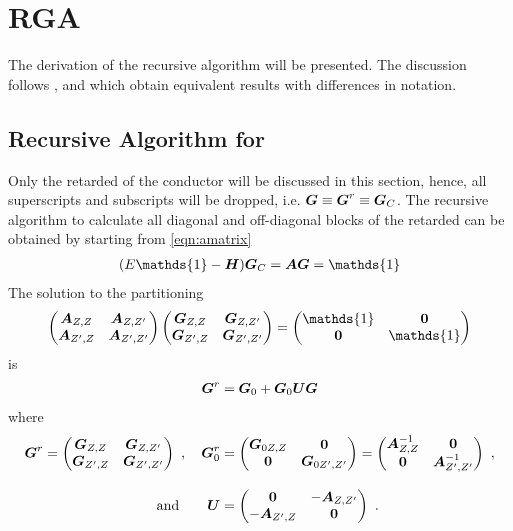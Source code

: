 \chapter{RGA}
\label{app:RGA}
The derivation of the recursive \gfnc{} algorithm will be presented. The discussion follows \cite{JApplPhys.91.2343}, \cite{JApplPhys.81.7845} and \cite{Wimmer2009Thesis} which obtain equivalent results with differences in notation.
\section{Recursive Algorithm for }
Only the retarded \gfnc{} of the conductor will be discussed in this section, hence, all superscripts and subscripts will be dropped, i.e. $\boldsymbol{G} \equiv \boldsymbol{G}^r\equiv \boldsymbol{G}_C$. The recursive algorithm to calculate all diagonal and off-diagonal blocks of the retarded \gfnc{} can be obtained by starting from \cref{eqn:amatrix}
\begin{align}
(E\mathds{1}-\mat{H})\mat{G}_C = \mat{A}\mat{G}=\mathds{1}
\label{eqn:amatrixppendix}
\end{align}
The solution to the partitioning
\begin{align}
\begin{pmatrix} \mat{A}_{Z,Z} & \mat{A}_{Z,Z'}\\
		\mat{A}_{Z',Z} & \mat{A}_{Z',Z'}
\end{pmatrix}
\begin{pmatrix} \mat{G}_{Z,Z} & \mat{G}_{Z,Z'}\\
		\mat{G}_{Z',Z} & \mat{G}_{Z',Z'}
\end{pmatrix} = 
\begin{pmatrix} \mathds{1} & \mat{0}\\
		\mat{0} & \mathds{1}
\end{pmatrix}
\end{align}
is
\begin{align}
\boldsymbol{G}^r=\boldsymbol{G}_0+\boldsymbol{G}_0\boldsymbol{U}\boldsymbol{G}
\label{eqn:dysonequationappendix}
\end{align}
where 
\begin{align}
\boldsymbol{G}^r = 
\begin{pmatrix} \boldsymbol{G}_{Z,Z} & \boldsymbol{G}_{Z,Z'}\\
		\boldsymbol{G}_{Z',Z} & \boldsymbol{G}_{Z',Z'}
\end{pmatrix}\ ,\quad
\boldsymbol{G}_0^r &= 
\begin{pmatrix} \boldsymbol{G}_{0 Z,Z} & \boldsymbol{0}\\
		\boldsymbol{0} & \boldsymbol{G}_{0 Z',Z'}
\end{pmatrix}=
\begin{pmatrix} \boldsymbol{A}^{-1}_{Z,Z} & \boldsymbol{0}\\
		\boldsymbol{0} & \boldsymbol{A}^{-1}_{Z',Z'}
\end{pmatrix}\ ,\notag\\[3mm] 
\text{and}\hspace{2em}
\boldsymbol{U} &= 
\begin{pmatrix} \boldsymbol{0} & -\boldsymbol{A}_{Z,Z'}\\
		-\boldsymbol{A}_{Z',Z} & \boldsymbol{0}
\end{pmatrix}\ .
\end{align}

